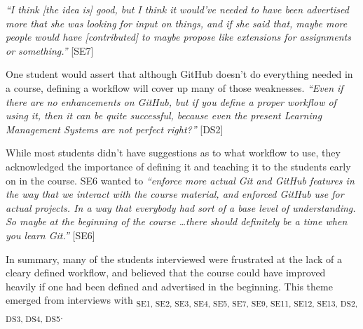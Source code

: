 \textit{``I think [the idea is] good, but I think it would've needed to have been advertised more that she was looking for input on things, and if she said that, maybe more people would have [contributed] to maybe propose like extensions for assignments or something.''} [SE7]

One student would assert that although GitHub doesn't do everything needed in a course, defining a workflow will cover up many of those weaknesses. \textit{``Even if there are no enhancements on GitHub, but if you define a proper workflow of using it, then it can be quite successful, because even the present Learning Management Systems are not perfect right?''} [DS2]

While most students didn't have suggestions as to what workflow to use, they acknowledged the importance of defining it and teaching it to the students early on in the course. SE6 wanted to \textit{``enforce more actual Git and GitHub features in the way that we interact with the course material, and enforced GitHub use for actual projects. In a way that everybody had sort of a base level of understanding. So maybe at the beginning of the course \ldots there should definitely be a time when you learn Git.''} [SE6]

In summary, many of the students interviewed were frustrated at the lack of a cleary defined workflow, and believed that the course could have improved heavily if one had been defined and advertised in the beginning. This theme emerged from interviews with \textsubscript{SE1, SE2, SE3, SE4, SE5, SE7, SE9, SE11, SE12, SE13, DS2, DS3, DS4, DS5}.



